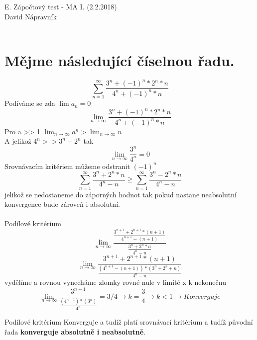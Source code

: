 \documentclass[a4paper,titlepage]{article}
\title{}
\author{David Nápravník}
\date{2018}
\begin{document}
\noindent E. Zápočtový test - MA I. (2.2.2018) \\
David Nápravník\\
\\
\setcounter{section}{1}





\section{Mějme následující číselnou řadu.}
$$
\sum^{\infty}_{n=1}\frac{3^n+(-1)^n*2^n*n}{4^n + (-1)^n*n}
$$
Podíváme se zda $\lim a_n = 0$
$$
\lim_{n\to \infty}\frac{3^n+(-1)^n*2^n*n}{4^n + (-1)^n*n}
$$
Pro a >> 1 $ \lim_{n\to \infty} a^n > \lim_{n\to \infty} n $\\
A jelikož $4^n >> 3^n + 2^n$ tak
$$
\lim_{n\to \infty}\frac{3^n}{4^n} = 0
$$
Srovnávacím kritériem můžeme odstranit $(-1)^n$ 
$$
\sum^{\infty}_{n=1}\frac{3^n+2^n*n}{4^n - n}  \geq 
\sum^{\infty}_{n=1}\frac{3^n-2^n*n}{4^n - n}
$$
jelikož se nedostaneme do záporných hodnot tak pokud nastane neabsolutní konvergence bude zároveň i absolutní.\\
\\
Podílové kritérium
$$
\lim_{n \to \infty}\frac{\frac{3^{n+1}+2^{n+1}*(n+1)}{4^{n+1} - (n+1)}}{\frac{3^n+2^n*n}{4^n - n}}
$$
$$
\lim_{n \to \infty}\frac{3^{n+1}+2^{n+1}*(n+1)}{\frac{(4^{n+1}-(n+1))*(3^n+2^n+n)}{4^n - n}}
$$
vydělíme a rovnou vynecháme zlomky rovné nule v limité x k nekonečnu
$$
\lim_{n \to \infty}\frac{3^{n+1}}{\frac{(4^{n+1})*(3^n)}{4^n}} =3/4 \to k = \frac{3}{4} \to k <1 \to Konverguje
$$

Podílové kritérium Konverguje a tudíž platí srovnávací kritérium a tudíž původní řada \textbf{konverguje absolutně i neabsolutně}.
\end{document}
